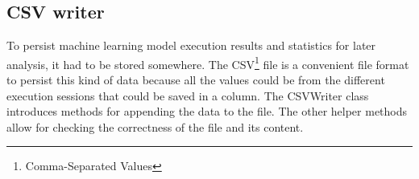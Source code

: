 \subsection{CSV writer}\label{subsec:csv-writer}
To persist machine learning model execution results and statistics for later analysis, it had to be stored somewhere.
The CSV\footnote{Comma-Separated Values} file is a convenient file format to persist this kind of data because all the values could be from the different execution sessions that could be saved in a column.
The CSVWriter class introduces methods for appending the data to the file. The other helper methods allow for checking the correctness of the file and its content.

